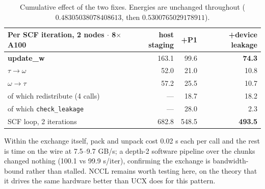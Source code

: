 \documentclass[11pt]{article}
\begin{document}
\begin{table}[H]\small\centering
\begin{tabular}{@{}lrrr@{}}
\toprule
Per SCF iteration, 2 nodes $\cdot$ 8$\times$A100 & host staging & +P1 & +device leakage \\
\midrule
\textbf{update\_w} & 163.1 & 99.6 & \textcolor{good}{\textbf{74.3}} \\
\quad $\tau\rightarrow\omega$ & 52.0 & 21.0 & \textcolor{good}{10.8} \\
\quad $\omega\rightarrow\tau$ & 57.2 & 25.5 & \textcolor{good}{10.7} \\
\quad\quad of which redistribute (4 calls) & --- & 18.7 & 18.2 \\
\quad\quad of which \texttt{check\_leakage} & --- & 28.0 & \textcolor{good}{2.3} \\
\midrule
SCF loop, 2 iterations & 682.8 & 548.5 & \textcolor{good}{\textbf{493.5}} \\
\bottomrule
\end{tabular}
\caption{Cumulative effect of the two fixes. Energies are unchanged throughout
($0.48305038078408613$, then $0.5300765029178911$).}
\end{table}

\noindent Within the exchange itself, pack and unpack cost 0.02 s each per call and the
rest is time on the wire at 7.5--9.7 GB/s; a depth-2 software pipeline over the chunks
changed nothing (100.1 vs 99.9 s/iter), confirming the exchange is bandwidth-bound rather
than stalled. NCCL remains worth testing here, on the theory that it drives the same
hardware better than UCX does for this pattern.
\end{document}
